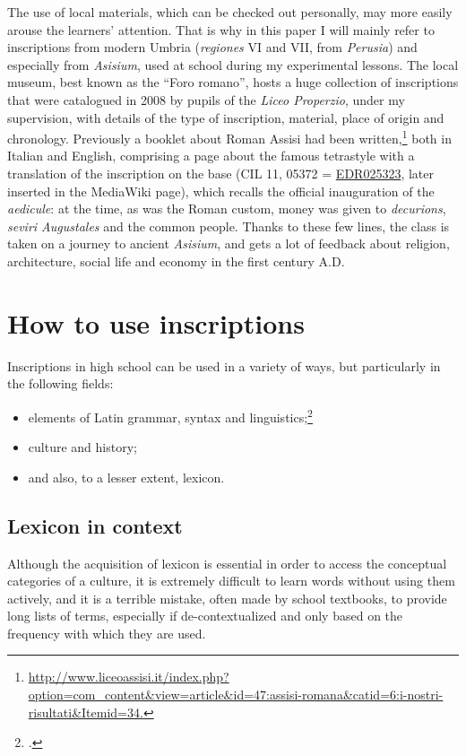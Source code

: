 \documentclass[amsthm,ebook]{saparticle}
\begin{document}
The use of local materials, which can be checked out personally, may more easily arouse the learners’ attention. That is
why in this paper I will mainly refer to inscriptions from modern Umbria (\emph{regiones} VI and VII, from \emph{Perusia}) and
especially from \emph{Asisium}, used at school during my experimental lessons. The local museum, best known as the ``Foro
romano'', hosts a huge collection of inscriptions that were catalogued in 2008 by pupils of the \emph{Liceo Properzio}, under
my supervision, with details of the type of inscription, material, place of origin and chronology. Previously a booklet
about Roman Assisi had been
written,\footnote{\url{http://www.liceoassisi.it/index.php?option=com\_content\&view=article\&id=47:assisi-romana\&catid=6:i-nostri-risultati\&Itemid=34.}}
both in Italian and English, comprising a page about the famous tetrastyle with a translation of the inscription on the
base (CIL 11, 05372 = \href{http://www.edr-edr.it/edr\_programmi/res\_complex\_comune.php?do=book\&id\_nr=EDR025323}{EDR025323}, later inserted in the MediaWiki page), which recalls the official inauguration of the
\emph{aedicule}: at the time, as was the Roman custom, money was given to \emph{decurions}, \emph{seviri Augustales} and the common people.
Thanks to these few lines, the class is taken on a journey to ancient \emph{Asisium}, and gets a lot of feedback about
religion, architecture, social life and economy in the first century A.D.

\section{How to use inscriptions}
\noindent Inscriptions in high school can be used in a variety of ways, but particularly in the following fields:

\begin{itemize}
\item elements of Latin grammar, syntax and linguistics;\footnote{\citet{Hartnett2012, McCarthy1992}.}
\item culture and history;
\item and also, to a lesser extent, lexicon. 
\end{itemize}



\subsection{Lexicon in context}
\noindent Although the acquisition of lexicon is essential in order to access the conceptual categories of a culture, it is
extremely difficult to learn words without using them actively, and it is a terrible mistake, often made by school
textbooks, to provide long lists of terms, especially if de-contextualized and only based on the frequency with which
they are used.
\end{document}
